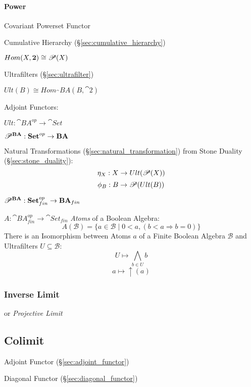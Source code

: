 \paragraph{Power}\label{sec:power}\hfill

Covariant Powerset Functor %

Cumulative Hierarchy (\S\ref{sec:cumulative_hierarchy})

$Hom(X,\mathbf{2}) \cong \mathscr{P}(X)$

Ultrafilters (\S\ref{sec:ultrafilter})

$Ult(B) \cong Hom_\cat{BA}(B,\cat{2})$

Adjoint Functors:

$Ult : \cat{BA}^{op} \rightarrow \cat{Set}$

$\mathscr{P}^\mathbf{BA} : \mathbf{Set}^{op} \rightarrow \mathbf{BA}$

Natural Transformations (\S\ref{sec:natural_transformation}) from
Stone Duality (\S\ref{sec:stone_duality}):
\[
  \eta_X : X \rightarrow Ult(\mathscr{P}(X))
\]\[
  \phi_B : B \rightarrow \mathscr{P}(Ult(B))
\]

$\mathscr{P}^\mathbf{BA} :
  \mathbf{Set}^{op}_{fin} \rightarrow \mathbf{BA}_{fin}$

$A : \cat{BA}^{op}_{fin} \rightarrow \cat{Set}_{fin}$
\emph{Atoms} of a Boolean Algebra:
\[
  A(\mathcal{B}) = \{ a \in \mathcal{B} \;|\;
    0 < a, (b < a \Rightarrow b = 0) \}
\]
There is an Isomorphism between Atoms $a$ of a Finite Boolean Algebra
$\mathcal{B}$ and Ultrafilters $U \subseteq \mathcal{B}$:
\[
  U \mapsto \bigwedge_{b \in U} b
\]\[
  a \mapsto \uparrow (a)
\]



\subsubsection{Inverse Limit}\label{sec:inverse_limit}

or \emph{Projective Limit}



\subsection{Colimit}\label{sec:colimit}

Adjoint Functor (\S\ref{sec:adjoint_functor})

Diagonal Functor (\S\ref{sec:diagonal_functor})

